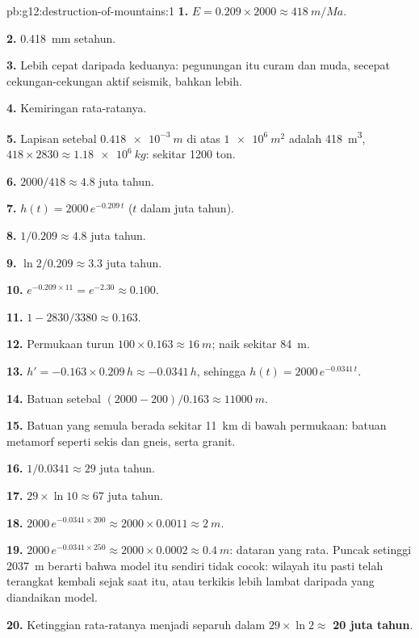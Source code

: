 \begin{solution}{pb:g12:destruction-of-mountains:1}
\textbf{1.} $E = 0.209 \times 2000 \approx \qty{418}{m/Ma}$.

\textbf{2.} \qty{0.418}{mm} setahun.

\textbf{3.} Lebih cepat daripada keduanya: pegunungan itu curam dan muda,
secepat cekungan-cekungan aktif seismik, bahkan lebih.

\textbf{4.} Kemiringan rata-ratanya.

\textbf{5.} Lapisan setebal $\qty{0.418e-3}{m}$ di atas $\qty{1e6}{m^2}$ adalah
\qty{418}{m^3}, $418 \times 2830 \approx \qty{1.18e6}{kg}$: sekitar 1200
ton.

\textbf{6.} $2000/418 \approx 4.8$ juta tahun.

\textbf{7.} $h(t) = 2000\,e^{-0.209\,t}$ ($t$ dalam juta tahun).

\textbf{8.} $1/0.209 \approx 4.8$ juta tahun.

\textbf{9.} $\ln 2/0.209 \approx 3.3$ juta tahun.

\textbf{10.} $e^{-0.209 \times 11} = e^{-2.30} \approx 0.100$.

\textbf{11.} $1 - 2830/3380 \approx 0.163$.

\textbf{12.} Permukaan turun $100 \times 0.163 \approx \qty{16}{m}$;
 naik sekitar \qty{84}{m}.

\textbf{13.} $h' = -0.163 \times 0.209\,h \approx -0.0341\,h$, sehingga $h(t) =
2000\,e^{-0.0341\,t}$.

\textbf{14.} Batuan setebal $(2000 - 200)/0.163 \approx \qty{11000}{m}$.

\textbf{15.} Batuan yang semula berada sekitar \qty{11}{km} di bawah permukaan:
batuan metamorf seperti sekis dan gneis, serta granit.

\textbf{16.} $1/0.0341 \approx 29$ juta tahun.

\textbf{17.} $29 \times \ln 10 \approx 67$ juta tahun.

\textbf{18.} $2000\,e^{-0.0341 \times 200} \approx 2000 \times 0.0011 \approx
\qty{2}{m}$.

\textbf{19.} $2000\,e^{-0.0341 \times 250} \approx 2000 \times 0.0002 \approx
\qty{0.4}{m}$: dataran yang rata. Puncak setinggi \qty{2037}{m} berarti bahwa
model itu sendiri tidak cocok: wilayah itu pasti telah terangkat kembali sejak
saat itu, atau terkikis lebih lambat daripada yang diandaikan model.

\textbf{20.} Ketinggian rata-ratanya menjadi separuh dalam $29 \times \ln 2 \approx$
\textbf{20 juta tahun}.
\end{solution}
